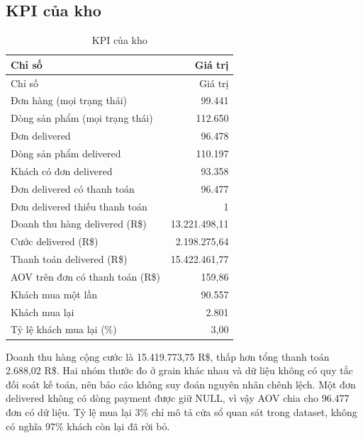 \subsection{KPI của kho}
\begingroup\small\renewcommand{\arraystretch}{1.15}
\begin{longtable}{p{0.70\linewidth}r}
\caption{KPI của kho}\label{tab:kpi}\\
\toprule Chỉ số & Giá trị\\\midrule\endfirsthead
\toprule Chỉ số & Giá trị\\\midrule\endhead
\bottomrule\endfoot
Đơn hàng (mọi trạng thái) & 99.441 \\
Dòng sản phẩm (mọi trạng thái) & 112.650 \\
Đơn delivered & 96.478 \\
Dòng sản phẩm delivered & 110.197 \\
Khách có đơn delivered & 93.358 \\
Đơn delivered có thanh toán & 96.477 \\
Đơn delivered thiếu thanh toán & 1 \\
Doanh thu hàng delivered (R\$) & 13.221.498,11 \\
Cước delivered (R\$) & 2.198.275,64 \\
Thanh toán delivered (R\$) & 15.422.461,77 \\
AOV trên đơn có thanh toán (R\$) & 159,86 \\
Khách mua một lần & 90.557 \\
Khách mua lại & 2.801 \\
Tỷ lệ khách mua lại (\%) & 3,00 \\
\end{longtable}\endgroup

Doanh thu hàng cộng cước là 15.419.773,75 R\$, thấp hơn tổng thanh toán 2.688,02 R\$. Hai nhóm thước đo ở grain khác nhau và dữ liệu không có quy tắc đối soát kế toán, nên báo cáo không suy đoán nguyên nhân chênh lệch. Một đơn delivered không có dòng payment được giữ NULL, vì vậy AOV chia cho 96.477 đơn có dữ liệu. Tỷ lệ mua lại 3\% chỉ mô tả cửa sổ quan sát trong dataset, không có nghĩa 97\% khách còn lại đã rời bỏ.

